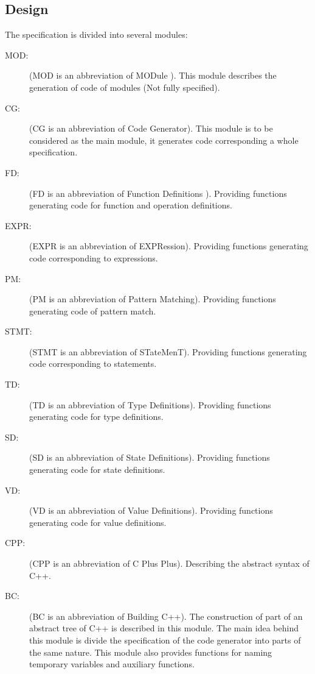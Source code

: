 \documentclass[a4paper,dvips]{article}
\begin{document}
\subsection{Design}

The specification is divided into several modules:

\begin{description} 

\item[MOD:] (MOD is an abbreviation of MODule ). This module describes the generation of code of
modules (Not fully specified).

\item[CG:] (CG is an abbreviation of Code Generator). This module is
  to be considered as the main module, it generates code corresponding
  a whole specification.


\item[FD: ] (FD is an abbreviation of Function Definitions ).
  Providing functions generating code for function and operation
  definitions.

\item[EXPR: ] (EXPR is an abbreviation of EXPRession). Providing
  functions generating code corresponding to expressions.

\item[PM: ] (PM is an abbreviation of Pattern Matching). Providing
  functions generating code of pattern match. 
  
\item[STMT: ] (STMT is an abbreviation of STateMenT). Providing
  functions generating code corresponding to statements.

\item[TD: ] (TD is an abbreviation of Type Definitions). Providing
  functions generating code for type definitions.

\item[SD: ] (SD is an abbreviation of State Definitions). Providing
  functions generating code for state definitions.

\item[VD: ] (VD is an abbreviation of Value Definitions). Providing
  functions generating code for value definitions.

\item[CPP:] (CPP is an abbreviation of C Plus Plus). Describing the
  abstract syntax of C++.

\item[BC: ] (BC is an abbreviation of Building C++). The construction
  of part of an abstract tree of C++ is described in this module. The
  main idea behind this module is divide the specification of the code
  generator into parts of the same nature. This module also provides
  functions for naming temporary variables and auxiliary functions.


\end{description}
\end{document}
